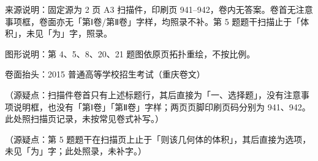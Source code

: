 

\begin{gktip}
来源说明：固定源为 2 页 A3 扫描件，印刷页 941–942，卷内无答案。卷首无注意事项框，卷面亦无「第Ⅰ卷/第Ⅱ卷」字样，均照录不补。第 5 题题干扫描止于「体积」，未见「为」字，照录。

图形说明：第 4、5、8、20、21 题图依原页拓扑重绘，不按比例。
\end{gktip}

\begin{gktip}
卷面抬头：2015 普通高等学校招生考试（重庆卷文）

（源疑点：扫描件卷首只有上述标题行，其后直接为「一、选择题」，没有注意事项说明框，也没有「第Ⅰ卷」「第Ⅱ卷」字样；两页页脚印刷页码分别为 941、942。此处照扫描页记录，未按常见卷式补写。）

（源疑点：第 5 题题干在扫描页上止于「则该几何体的体积」，其后直接为选项，未见「为」字；此处照录，未补字。）
\end{gktip}


